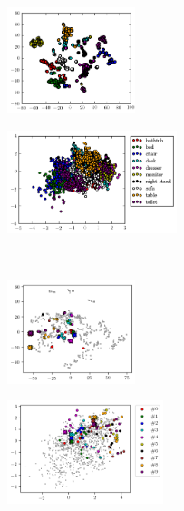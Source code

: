 \begin{figure}[t]
    \vspace*{-\figskipabove px}
    \centering
    \hspace*{-22px}
    \begin{subfigure}[t]{0.49\linewidth}
        \includegraphics[height=3.1cm]{gls_modelnet10_codes_}
        \label{fig:results-latent-space-a1}
    \end{subfigure}
    \hspace*{-12px}
    \begin{subfigure}[t]{0.49\linewidth}
        \includegraphics[height=3cm]{gls_modelnet10_codes2}
        \label{fig:results-latent-space-a2}
    \end{subfigure}
    \\
    \hspace*{-22px}
    \begin{subfigure}[t]{0.49\linewidth}
        \includegraphics[height=3cm]{gls_clean_codes_outputs_}
        \label{fig:results-latent-space-b1}
    \end{subfigure}
    \hspace*{-12px}
    \begin{subfigure}[t]{0.49\linewidth}
        \includegraphics[height=3cm]{gls_clean_codes2_outputs}

\end{subfigure}
\end{figure}
